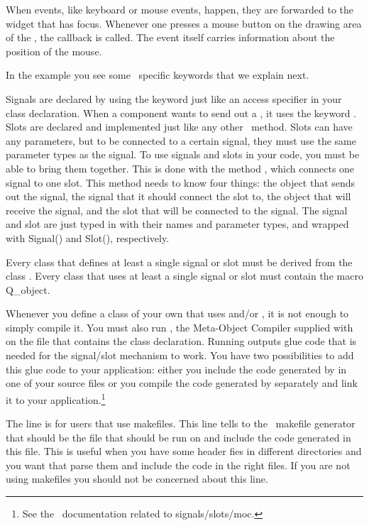 When events, like keyboard or mouse events, happen, they
are forwarded to the widget that has focus.  Whenever one
presses a mouse button on the drawing area of the ,
the callback  is called.
The event itself carries information about the position of the mouse.

In the example you see some \qt\ specific keywords that we explain
next.

Signals are declared by using the keyword  just like an
access specifier in your class declaration. When a component wants to
send out a , it uses the keyword . Slots are
declared and implemented just like any other \CC\ method. Slots can
have any parameters, but to be connected to a certain signal, they
must use the same parameter types as the signal. To use signals and
slots in your code, you must be able to bring them together. This is
done with the method , which connects one
signal to one slot. This method needs to know four things: the object
that sends out the signal, the signal that it should connect the slot
to, the object that will receive the signal, and the slot that will be 
connected to the signal. The signal and slot are just typed in with
their names and parameter types, and wrapped with {\sc Signal()} and
{\sc Slot()}, respectively.

Every class that defines at least a single signal or slot must 
be derived from the class . Every class that uses at
least a single signal or slot must contain the macro {\sc Q\_object}.

Whenever you define a class of your own that uses  and/or
, it is not enough to simply compile it. You must also run
, the Meta-Object Compiler supplied with \qt\, on the file
that contains the class declaration. Running  outputs glue code that
is needed for the signal/slot mechanism to work. You have two
possibilities to add this glue code to your application: either you
include the code generated by  in one of your source files or 
you compile the code generated by  separately and link it to your
application.\footnote{See the \qt\ documentation related to signals/slots/moc.}

The line  is for users that use
makefiles. This line tells to the \cgal\ makefile generator that
 should be the file that  should be run on
and include the code generated in this file. This is useful when you
have some header fies in different directories and you want that
 parse them and include the code in the right files. If you
are not using makefiles you should not be concerned about this line.

